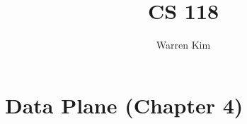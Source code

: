 \documentclass{report}
\title{CS 118}
\author{Warren Kim}
\date{}
\begin{document}
\tableofcontents
\newpage
\chapter{Data Plane (Chapter 4)}  
\end{document}

